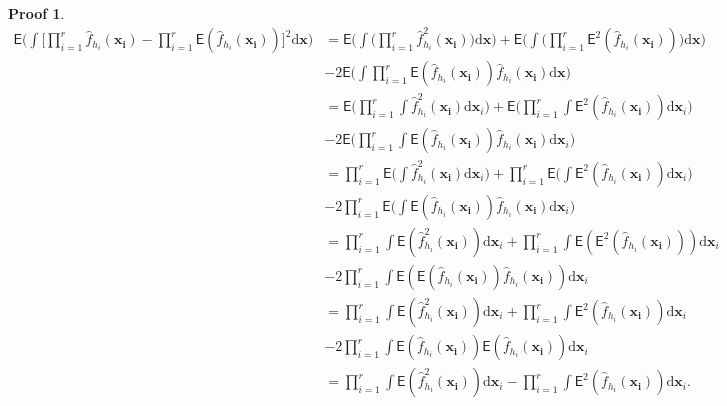 \documentclass{article}
\newtheorem{Proof}{Proof}[section]
\begin{document}
\begin{Proof}
\begin{align}
    \mathsf{E} \Bigg( \int \Big[ \prod_{i = 1}^{r} \hat{f}_{h_i}(\mathbf{x_i}) - \prod_{i = 1}^{r} \mathsf{E} (\hat{f}_{h_i} (\mathbf{x_i})) \Big]^2 \mathrm{d} \mathbf{x} \Bigg) &= \mathsf{E} \Bigg( \int  \Bigg( \prod_{i = 1}^{r} \hat{f}_{h_i}^2(\mathbf{x_i}) \Bigg) \mathrm{d} \mathbf{x} \Bigg)  + \mathsf{E} \Bigg( \int \Bigg( \prod_{i = 1}^{r} \mathsf{E}^2 (\hat{f}_{h_i} (\mathbf{x_i})) \Bigg) \mathrm{d} \mathbf{x} \Bigg) \\
    &- 2 \mathsf{E} \Bigg( \int \prod_{i = 1}^{r} \mathsf{E} (\hat{f}_{h_i} (\mathbf{x_i})) \hat{f}_{h_i} (\mathbf{x_i}) \mathrm{d} \mathbf{x} \Bigg) \\
    &= \mathsf{E} \Bigg( \prod_{i = 1}^{r} \int  \hat{f}_{h_i}^2(\mathbf{x_i}) \mathrm{d} \mathbf{x}_i \Bigg)  + \mathsf{E} \Bigg( \prod_{i = 1}^{r} \int \mathsf{E}^2 (\hat{f}_{h_i} (\mathbf{x_i})) \mathrm{d} \mathbf{x}_i \Bigg) \\
    &- 2 \mathsf{E} \Bigg( \prod_{i = 1}^{r} \int \mathsf{E} (\hat{f}_{h_i} (\mathbf{x_i})) \hat{f}_{h_i} (\mathbf{x_i}) \mathrm{d} \mathbf{x}_i \Bigg) \\
    &= \prod_{i = 1}^{r} \mathsf{E} \Bigg( \int  \hat{f}_{h_i}^2(\mathbf{x_i}) \mathrm{d} \mathbf{x}_i \Bigg)  + \prod_{i = 1}^{r} \mathsf{E} \Bigg( \int \mathsf{E}^2 (\hat{f}_{h_i} (\mathbf{x_i})) \mathrm{d} \mathbf{x}_i \Bigg) \\
     &- 2 \prod_{i = 1}^{r} \mathsf{E} \Bigg( \int \mathsf{E} (\hat{f}_{h_i} (\mathbf{x_i})) \hat{f}_{h_i} (\mathbf{x_i}) \mathrm{d} \mathbf{x}_i \Bigg) \\
     &= \prod_{i = 1}^{r} \int \mathsf{E} (  \hat{f}_{h_i}^2(\mathbf{x_i}) ) \mathrm{d} \mathbf{x}_i  + \prod_{i = 1}^{r} \int \mathsf{E} ( \mathsf{E}^2 (\hat{f}_{h_i} (\mathbf{x_i})) ) \mathrm{d} \mathbf{x}_i \\
     &- 2 \prod_{i = 1}^{r} \int \mathsf{E} ( \mathsf{E} (\hat{f}_{h_i} (\mathbf{x_i})) \hat{f}_{h_i} (\mathbf{x_i}) ) \mathrm{d} \mathbf{x}_i \\
     &= \prod_{i = 1}^{r} \int \mathsf{E} (  \hat{f}_{h_i}^2(\mathbf{x_i}) ) \mathrm{d} \mathbf{x}_i  + \prod_{i = 1}^{r} \int \mathsf{E}^2 (\hat{f}_{h_i} (\mathbf{x_i})) \mathrm{d} \mathbf{x}_i \\
     &- 2 \prod_{i = 1}^{r} \int \mathsf{E} (\hat{f}_{h_i} (\mathbf{x_i})) \mathsf{E} (\hat{f}_{h_i} (\mathbf{x_i}) ) \mathrm{d} \mathbf{x}_i \\
     &= \prod_{i = 1}^{r} \int \mathsf{E} (  \hat{f}_{h_i}^2(\mathbf{x_i}) ) \mathrm{d} \mathbf{x}_i  - \prod_{i = 1}^{r} \int \mathsf{E}^2 (\hat{f}_{h_i} (\mathbf{x_i})) \mathrm{d} \mathbf{x}_i.

\end{align}
\end{Proof}
\end{document}
